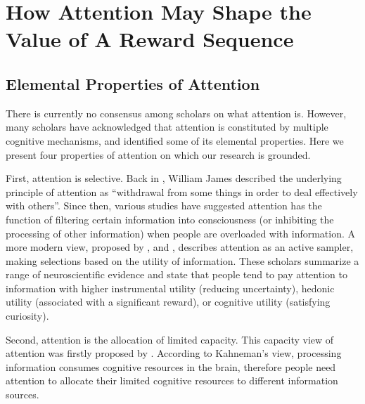 \documentclass[
  12pt,
]{article}
\begin{document}
\hypertarget{how-attention-may-shape-the-value-of-a-reward-sequence}{%
\section{How Attention May Shape the Value of A Reward
Sequence}\label{how-attention-may-shape-the-value-of-a-reward-sequence}}

\hypertarget{elemental-properties-of-attention}{%
\subsection{Elemental Properties of
Attention}\label{elemental-properties-of-attention}}

There is currently no consensus among scholars on what attention is.
However, many scholars have acknowledged that attention is constituted
by multiple cognitive mechanisms, and identified some of its elemental
properties. Here we present four properties of attention on which our
research is grounded.

First, attention is selective. Back in \citeyear{james1890}, William
James described the underlying principle of attention as ``withdrawal
from some things in order to deal effectively with others''. Since then,
various studies have suggested attention has the function of filtering
certain information into consciousness (or inhibiting the processing of
other information) when people are overloaded with information. A more
modern view, proposed by \citet{gottlieb2010attention},
\citet{gottlieb2012attention} and \citet{sharot2020people}, describes
attention as an active sampler, making selections based on the utility
of information. These scholars summarize a range of neuroscientific
evidence and state that people tend to pay attention to information with
higher instrumental utility (reducing uncertainty), hedonic utility
(associated with a significant reward), or cognitive utility (satisfying
curiosity).

Second, attention is the allocation of limited capacity. This capacity
view of attention was firstly proposed by \citet{kahneman1973}.
According to Kahneman's view, processing information consumes cognitive
resources in the brain, therefore people need attention to allocate
their limited cognitive resources to different information sources.
\end{document}
